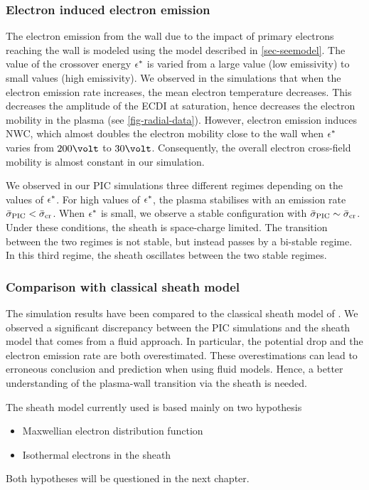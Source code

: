   
  \subsubsection*{Electron induced electron emission}
  
  The electron  emission from the wall due to the impact of primary electrons reaching the wall is modeled using the model described in \cref{sec-seemodel}.
  The value of the crossover energy $\epsilon^{*}$ is varied from a large value (low emissivity) to small values (high emissivity).
  We observed in the simulations that when the electron emission rate increases, the mean electron temperature decreases.
  This decreases the amplitude of the \ac{ECDI} at saturation, hence decreases the electron mobility in the plasma (see \cref{fig-radial-data}).
  However, electron emission induces \ac{NWC}, which almost doubles the electron mobility close to the wall when $\epsilon^{*}$ varies from $200\volt$ to $30\volt$.
  Consequently, the overall electron cross-field mobility is almost constant in our simulation.
  
  We observed in our \ac{PIC} simulations three different regimes depending on the values of $\epsilon^{*}$.
  For high values of $\epsilon^{*}$, the plasma stabilises with an emission rate $ \bar{\sigma }_{\rm PIC} <  \bar{\sigma }_{\rm cr}$.
  When $\epsilon^{*}$ is small, we observe a stable configuration with $ \bar{\sigma }_{\rm PIC} \sim  \bar{\sigma }_{\rm cr}$.
  Under these conditions, the sheath is space-charge limited.
  The transition between the two regimes is not stable, but instead passes by a bi-stable regime.
  In this third regime, the sheath oscillates between the two stable regimes.
  

  \subsubsection*{Comparison with classical sheath model}
  
  The simulation results have been compared to the classical sheath model of \citet{hobbs1967}.
  We observed a significant discrepancy between the \ac{PIC} simulations and the sheath model that comes from a fluid approach.
  In particular, the potential drop and the electron emission rate are both overestimated.
  These overestimations can lead to erroneous conclusion and prediction when using fluid models.
  Hence, a better understanding of the plasma-wall transition via the sheath is needed.
  
  The sheath model currently used is based mainly on two hypothesis
  \begin{itemize}
    \item Maxwellian electron distribution function
    \item Isothermal electrons in the sheath
  \end{itemize}
  
  Both hypotheses will be questioned in the next chapter.
  
